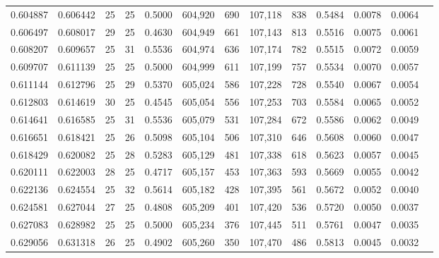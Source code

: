 \begin{tabular}{rrrrrrrrrrrrr}
0.604887 & 0.606442 &    25 &  25 &                                     0.5000 & 604,920 &     690 & 107,118 &     838 & 0.5484 & 0.0078 & 0.0064 \\
0.606497 & 0.608017 &    29 &  25 &                                     0.4630 & 604,949 &     661 & 107,143 &     813 & 0.5516 & 0.0075 & 0.0061 \\
0.608207 & 0.609657 &    25 &  31 &                                     0.5536 & 604,974 &     636 & 107,174 &     782 & 0.5515 & 0.0072 & 0.0059 \\
0.609707 & 0.611139 &    25 &  25 &                                     0.5000 & 604,999 &     611 & 107,199 &     757 & 0.5534 & 0.0070 & 0.0057 \\
0.611144 & 0.612796 &    25 &  29 &                                     0.5370 & 605,024 &     586 & 107,228 &     728 & 0.5540 & 0.0067 & 0.0054 \\
0.612803 & 0.614619 &    30 &  25 &                                     0.4545 & 605,054 &     556 & 107,253 &     703 & 0.5584 & 0.0065 & 0.0052 \\
0.614641 & 0.616585 &    25 &  31 &                                     0.5536 & 605,079 &     531 & 107,284 &     672 & 0.5586 & 0.0062 & 0.0049 \\
0.616651 & 0.618421 &    25 &  26 &                                     0.5098 & 605,104 &     506 & 107,310 &     646 & 0.5608 & 0.0060 & 0.0047 \\
0.618429 & 0.620082 &    25 &  28 &                                     0.5283 & 605,129 &     481 & 107,338 &     618 & 0.5623 & 0.0057 & 0.0045 \\
0.620111 & 0.622003 &    28 &  25 &                                     0.4717 & 605,157 &     453 & 107,363 &     593 & 0.5669 & 0.0055 & 0.0042 \\
0.622136 & 0.624554 &    25 &  32 &                                     0.5614 & 605,182 &     428 & 107,395 &     561 & 0.5672 & 0.0052 & 0.0040 \\
0.624581 & 0.627044 &    27 &  25 &                                     0.4808 & 605,209 &     401 & 107,420 &     536 & 0.5720 & 0.0050 & 0.0037 \\
0.627083 & 0.628982 &    25 &  25 &                                     0.5000 & 605,234 &     376 & 107,445 &     511 & 0.5761 & 0.0047 & 0.0035 \\
0.629056 & 0.631318 &    26 &  25 &                                     0.4902 & 605,260 &     350 & 107,470 &     486 & 0.5813 & 0.0045 & 0.0032 \\

\end{tabular}
